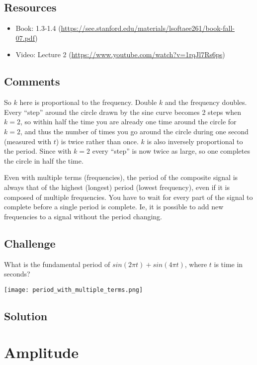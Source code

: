 \subsection*{Resources}
\begin{itemize}
    \item Book: 1.3-1.4 (\url{https://see.stanford.edu/materials/lsoftaee261/book-fall-07.pdf})
    \item Video: Lecture 2 (\url{https://www.youtube.com/watch?v=1rqJl7Rs6ps})
\end{itemize}

\subsection*{Comments}
So $k$ here is proportional to the frequency. Double $k$ and the frequency doubles. Every ``step'' around the circle drawn by the sine curve becomes 2 steps when $k=2$, so within half the time you are already one time around the circle for $k=2$, and thus the number of times you go around the circle during one second (measured with $t$) is twice rather than once. $k$ is also inversely proportional to the period. Since with $k=2$ every ``step'' is now twice as large, so one completes the circle in half the time.

Even with multiple terms (frequencies), the period of the composite signal is always that of the highest (longest) period (lowest frequency), even if it is composed of multiple frequencies. You have to wait for every part of the signal to complete before a single period is complete. Ie, it is possible to add new frequencies to a signal without the period changing.

\subsection*{Challenge}
What is the fundamental period of $sin(2 \pi t) + sin(4 \pi t)$, where $t$ is time in seconds?

\texttt{[image: period\_with\_multiple\_terms.png]}

\subsection*{Solution}





\newpage
\section{Amplitude}

